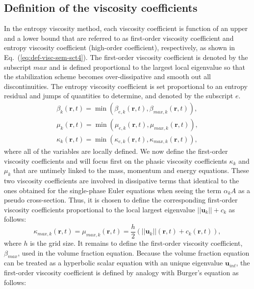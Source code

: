 \documentclass[preprint,10pt]{elsarticle}
\newcommand{\mbold}[1]{\boldsymbol#1}
\newcommand{\eqt}[1]{Eq.~(\ref{#1})}                     %
\begin{document}
\subsection{Definition of the viscosity coefficients}\label{sec:visc-coeff-sem}
In the entropy viscosity method, each viscosity coefficient is function of an upper and a lower bound that are referred to as first-order viscosity coefficient and entropy viscosity coefficient (high-order coefficient), respectively, as shown in \eqt{eq:def-visc-sem-sct4}. The first-order viscosity coefficient is denoted by the subscript $max$ and is defined proportional to the largest local eigenvalue so that the stabilization scheme becomes over-dissipative and smooth out all discontinuities. The entropy viscosity coefficient is set proportional to an entropy residual and jumps of quantities to determine, and denoted by the subscript $e$. 
%
\begin{align}\label{eq:def-visc-sem-sct4}
\beta_k( \mbold r, t) = \min \left( \beta_{e,k}( \mbold r, t), \beta_{max,k} ( \mbold r, t) \right), \nonumber \\
\mu_k( \mbold r, t) = \min \left( \mu_{e,k}( \mbold r, t), \mu_{max,k} ( \mbold r, t) \right),  \\
\kappa_k( \mbold r, t) = \min \left( \kappa_{e,k}( \mbold r, t), \kappa_{max,k} ( \mbold r, t) \right) ,\nonumber 
\end{align}
% 
where all of the variables are locally defined. We now define the first-order viscosity coefficients and will focus first on the phasic viscosity coefficients $\kappa_k$ and $\mu_k$ that are untimely linked to the mass, momentum and energy equations. These two viscosity coefficients are involved in dissipative terms that identical to the ones obtained for the single-phase Euler equations \cite{jlg, Marco_paper_low_mach} when seeing the term $\alpha_k A$ as a pseudo cross-section. Thus, it is chosen to define the corresponding first-order viscosity coefficients proportional to the local largest eigenvalue $|| \mbold u_k || + c_k$ as follows:
%
\begin{equation}\label{eq:def-visc-max-sem-sct4}
\kappa_{max,k}( \mbold r, t) = \mu_{max,k}( \mbold r, t) = \frac{h}{2} \left( || \mbold u_k||( \mbold r, t) + c_k( \mbold r, t) \right),
\end{equation}
%
where $h$ is the grid size. It remains to define the first-order viscosity coefficient, $\beta_{max}$, used in the volume fraction equation. Because the volume fraction equation can be treated as a hyperbolic scalar equation with an unique eigenvalue $\mbold u_{int}$, the first-order viscosity coefficient is defined by analogy with Burger's equation \cite{jlg1, jlg2} as follows:
\end{document}
